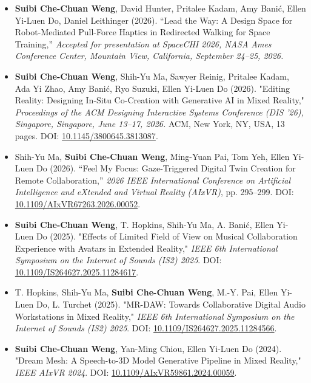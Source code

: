 \begin{itemize}


\item \textbf{Suibi Che-Chuan Weng}, David Hunter, Pritalee Kadam, Amy Banić, Ellen Yi-Luen Do, Daniel Leithinger (2026).
``Lead the Way: A Design Space for Robot-Mediated Pull-Force Haptics in Redirected Walking for Space Training,''
\textit{Accepted for presentation at SpaceCHI 2026, NASA Ames Conference Center, Mountain View, California, September 24--25, 2026.}

\item \textbf{Suibi Che-Chuan Weng}, Shih-Yu Ma, Sawyer Reinig, Pritalee Kadam, Ada Yi Zhao, Amy Banić, Ryo Suzuki, Ellen Yi-Luen Do (2026).
"Editing Reality: Designing In-Situ Co-Creation with Generative AI in Mixed Reality,"
\textit{Proceedings of the ACM Designing Interactive Systems Conference (DIS '26), Singapore, Singapore, June 13--17, 2026.}
ACM, New York, NY, USA, 13 pages.
DOI: \href{https://doi.org/10.1145/3800645.3813087}{10.1145/3800645.3813087}.


\item Shih-Yu Ma, \textbf{Suibi Che-Chuan Weng}, Ming-Yuan Pai, Tom Yeh, Ellen Yi-Luen Do (2026).
``Feel My Focus: Gaze-Triggered Digital Twin Creation for Remote Collaboration,''
\textit{2026 IEEE International Conference on Artificial Intelligence and eXtended and Virtual Reality (AIxVR)},
pp. 295--299.
DOI: \href{https://doi.org/10.1109/AIxVR67263.2026.00052}{10.1109/AIxVR67263.2026.00052}.


\item \textbf{Suibi Che-Chuan Weng}, T. Hopkins, Shih-Yu Ma, A. Banić, Ellen Yi-Luen Do (2025).
"Effects of Limited Field of View on Musical Collaboration Experience with Avatars in Extended Reality,"
\textit{IEEE 6th International Symposium on the Internet of Sounds (IS2) 2025}.
DOI: \href{https://doi.org/10.1109/IS264627.2025.11284617}{10.1109/IS264627.2025.11284617}.

\item T. Hopkins, Shih-Yu Ma, \textbf{Suibi Che-Chuan Weng}, M.-Y. Pai, Ellen Yi-Luen Do, L. Turchet (2025).
"MR-DAW: Towards Collaborative Digital Audio Workstations in Mixed Reality,"
\textit{IEEE 6th International Symposium on the Internet of Sounds (IS2) 2025}.
DOI: \href{https://doi.org/10.1109/IS264627.2025.11284566}{10.1109/IS264627.2025.11284566}.


     \item \textbf{Suibi Che-Chuan Weng}, Yan-Ming Chiou, Ellen Yi-Luen Do (2024). "Dream Mesh: A Speech-to-3D Model Generative Pipeline in Mixed Reality," \textit{IEEE AIxVR 2024}.
DOI: \href{https://doi.org/10.1109/AIxVR59861.2024.00059}{10.1109/AIxVR59861.2024.00059}.


\end{itemize}
